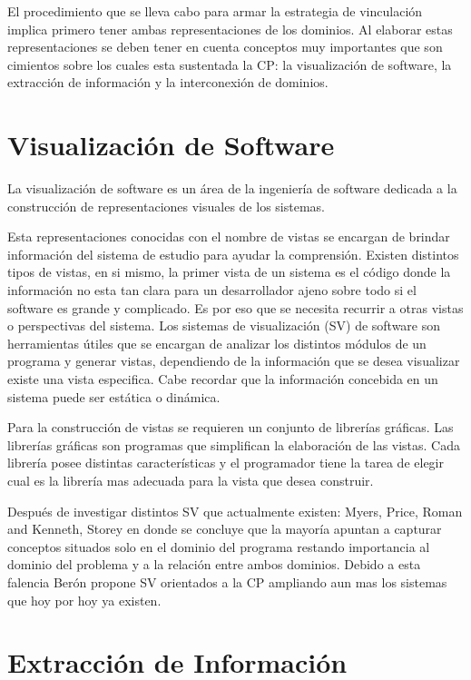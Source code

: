 \documentclass[12pt]{report}
\begin{document}
El procedimiento que se lleva cabo para armar la estrategia de vinculación implica primero tener ambas representaciones de los dominios. 
Al elaborar estas representaciones se deben tener en cuenta conceptos muy importantes que son cimientos sobre los cuales esta sustentada la CP: la visualización de software, la extracción de información y la interconexión de dominios.

\section{Visualización de Software}

La visualización de software es un área de la ingeniería de software dedicada a la construcción de representaciones visuales de los sistemas. 

Esta representaciones conocidas con el nombre de vistas se encargan de brindar información del sistema de estudio para ayudar la comprensión. Existen distintos tipos de vistas, en si mismo, la primer vista de un sistema es el código donde la información no esta tan clara para un desarrollador ajeno sobre todo si el software es grande y complicado. Es por eso que se necesita recurrir a otras vistas o perspectivas del sistema.
Los sistemas de visualización (SV) de software son herramientas útiles que se encargan de analizar los distintos módulos de un programa y generar vistas, dependiendo de la información que se desea visualizar existe una vista especifica\cite{MPMR07}. Cabe recordar que la información concebida en un sistema puede ser estática o dinámica.

Para la construcción de vistas se requieren un conjunto de librerías gráficas. Las librerías gráficas son programas que simplifican la elaboración de las vistas. Cada librería posee distintas características y el programador tiene la tarea de elegir cual es la librería mas adecuada para la vista que desea construir.


Después de investigar distintos SV que actualmente existen: Myers, Price, Roman and Kenneth, Storey\cite{MBPHRU10} %
en donde se concluye que la mayoría apuntan a capturar conceptos situados solo en el dominio del programa restando importancia al dominio del problema y a la relación entre ambos dominios. Debido a esta falencia Berón propone\cite{MBPHRU10} %
SV orientados a la CP ampliando aun mas los sistemas que hoy por hoy ya existen.

\section{Extracción de Información}
\end{document}
